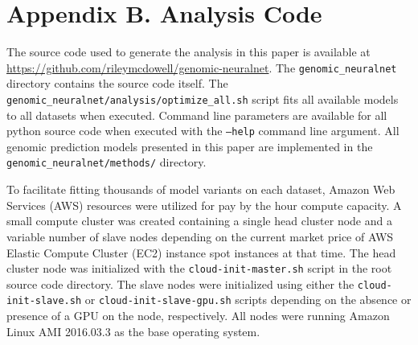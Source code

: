 \chapter*{Appendix B. Analysis Code} \label{app:analysis-code}

The source code used to generate the analysis in this paper is available at 
\url{https://github.com/rileymcdowell/genomic-neuralnet}. The \texttt{genomic\_neuralnet}
directory contains the source code itself. The 
\texttt{genomic\_neuralnet/analysis/optimize\_all.sh} script fits all available 
models to all datasets when executed. Command line parameters are available for all python source
code when executed with the \texttt{--help} command line argument. All genomic prediction models presented in this 
paper are implemented in the \texttt{genomic\_neuralnet/methods/} directory. 

To facilitate fitting thousands of model variants on each dataset, Amazon Web Services (AWS) 
resources were utilized for pay by the hour compute capacity. A small compute cluster was 
created containing a single head cluster node and a variable number of slave nodes depending
on the current market price of AWS Elastic Compute Cluster (EC2) instance spot instances at that time.
The head cluster node was initialized with the \texttt{cloud-init-master.sh} script in 
the root source code directory. The slave nodes were initialized
using either the \texttt{cloud-init-slave.sh} or \texttt{cloud-init-slave-gpu.sh} scripts
depending on the absence or presence of a GPU on the node, respectively. All
nodes were running Amazon Linux AMI 2016.03.3 as the base operating system.

